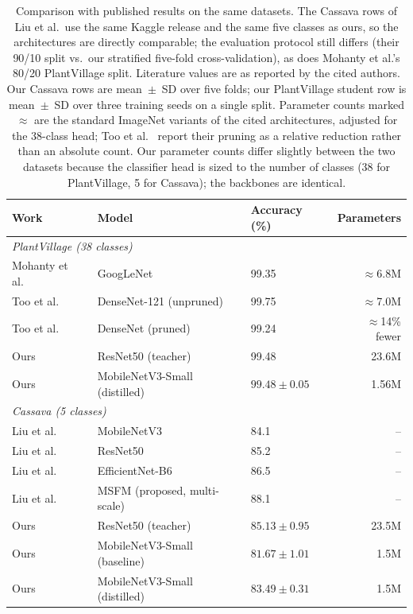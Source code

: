 \documentclass[conference]{IEEEtran}
\begin{document}
\begin{table}
  \centering
  \caption{Comparison with published results on the same datasets. The Cassava
  rows of Liu et al.\ use the same Kaggle release and the same five classes as
  ours, so the architectures are directly comparable; the evaluation protocol
  still differs (their 90/10 split vs.\ our stratified five-fold
  cross-validation), as does Mohanty et al.'s 80/20 PlantVillage split.
  Literature values are as reported by the cited authors. Our Cassava rows are
  mean~$\pm$~SD over five folds; our PlantVillage student row is mean~$\pm$~SD
  over three training seeds on a single split.
  Parameter counts marked $\approx$ are the standard ImageNet variants of the
  cited architectures, adjusted for the 38-class head; Too et al.\
  \cite{too2019pruned} report their pruning as a relative reduction rather than
  an absolute count. Our parameter counts differ slightly between the two
  datasets because the classifier head is sized to the number of classes (38 for
  PlantVillage, 5 for Cassava); the backbones are identical.}
  \label{tab:literature}
  \begin{tabular}{lllr}
    \toprule
    Work & Model & Accuracy (\%) & Parameters \\
    \midrule
    \multicolumn{4}{l}{\emph{PlantVillage (38 classes)}} \\
    Mohanty et al.\ \cite{mohanty2016using} & GoogLeNet                      & 99.35 & $\approx$6.8M \\
    Too et al.\ \cite{too2019comparative}   & DenseNet-121 (unpruned)        & 99.75 & $\approx$7.0M \\
    Too et al.\ \cite{too2019pruned}        & DenseNet (pruned)              & 99.24 & $\approx$14\% fewer \\
    Ours                                    & ResNet50 (teacher)             & 99.48 & 23.6M \\
    Ours                                    & MobileNetV3-Small (distilled)  & $99.48 \pm 0.05$ & 1.56M \\
    \midrule
    \multicolumn{4}{l}{\emph{Cassava (5 classes)}} \\
    Liu et al.\ \cite{liu2022research} & MobileNetV3                   & 84.1 & -- \\
    Liu et al.\ \cite{liu2022research} & ResNet50                      & 85.2 & -- \\
    Liu et al.\ \cite{liu2022research} & EfficientNet-B6               & 86.5 & -- \\
    Liu et al.\ \cite{liu2022research} & MSFM (proposed, multi-scale)  & 88.1 & -- \\
    Ours                               & ResNet50 (teacher)            & $85.13 \pm 0.95$ & 23.5M \\
    Ours                               & MobileNetV3-Small (baseline)  & $81.67 \pm 1.01$ & 1.5M \\
    Ours                               & MobileNetV3-Small (distilled) & $83.49 \pm 0.31$ & 1.5M \\
    \bottomrule
  \end{tabular}
\end{table}
\end{document}
